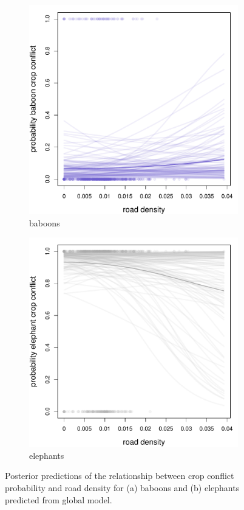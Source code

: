 \documentclass[12pt,]{article}
\begin{document}
\begin{figure}[H]
  \centering
	\begin{subfigure}[b]{0.49\textwidth}
	\includegraphics[width=\textwidth]{Figures/road_crop_global_conflict_bab.pdf} 
    \caption{baboons}
   	    \label{fig:cropRDbab}
\end{subfigure}
\begin{subfigure}[b]{0.49\textwidth}
	\includegraphics[width=\textwidth]{Figures/road_crop_global_conflict_ele.pdf}  
    \caption{elephants}
  	\label{fig:cropRDele}
\end{subfigure}
\caption{Posterior predictions of the relationship between crop conflict probability and road density for (a) baboons and (b) elephants predicted from global model.}
\end{figure}
\end{document}
